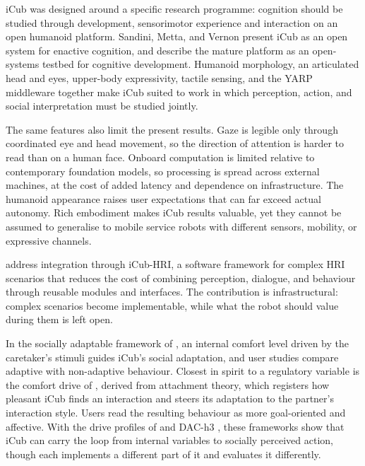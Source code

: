 iCub was designed around a specific research programme: cognition should be studied through development, sensorimotor experience and interaction on an open humanoid platform. Sandini, Metta, and Vernon \citeyearpar{Sandini2007ICubCognitive} present iCub as an open system for enactive cognition, and \citet{Metta2010ICub} describe the mature platform as an open-systems testbed for cognitive development. Humanoid morphology, an articulated head and eyes, upper-body expressivity, tactile sensing, and the YARP middleware together make iCub suited to work in which perception, action, and social interpretation must be studied jointly.

The same features also limit the present results. Gaze is legible only through coordinated eye and head movement, so the direction of attention is harder to read than on a human face. Onboard computation is limited relative to contemporary foundation models, so processing is spread across external machines, at the cost of added latency and dependence on infrastructure. The humanoid appearance raises user expectations that can far exceed actual autonomy. Rich embodiment makes iCub results valuable, yet they cannot be assumed to generalise to mobile service robots with different sensors, mobility, or expressive channels.

\citet{Fischer2018ICubHRI} address integration through iCub-HRI, a software framework for complex HRI scenarios that reduces the cost of combining perception, dialogue, and behaviour through reusable modules and interfaces. The contribution is infrastructural: complex scenarios become implementable, while what the robot should value during them is left open.

In the socially adaptable framework of \citet{Tanevska2020SociallyAdaptable}, an internal comfort level driven by the caretaker's stimuli guides iCub's social adaptation, and user studies compare adaptive with non-adaptive behaviour. Closest in spirit to a regulatory variable is the comfort drive of \citet{Mongile2025ComfortDriven}, derived from attachment theory, which registers how pleasant iCub finds an interaction and steers its adaptation to the partner's interaction style. Users read the resulting behaviour as more goal-oriented and affective. With the drive profiles of \citet{Berto2025CuriosityAffect} and DAC-h3 \citep{MoulinFrier2018DACH3}, these frameworks show that iCub can carry the loop from internal variables to socially perceived action, though each implements a different part of it and evaluates it differently.

